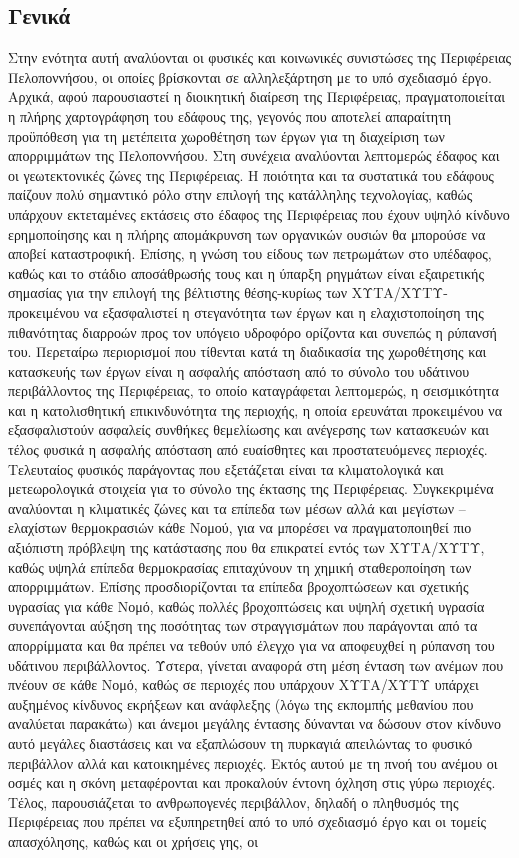 \documentclass[12pt]{article}
\begin{document}
	\subsection{Γενικά}
	
	Στην ενότητα αυτή αναλύονται οι φυσικές και κοινωνικές συνιστώσες της Περιφέρειας Πελοποννήσου, οι οποίες βρίσκονται σε αλληλεξάρτηση με το υπό σχεδιασμό έργο. Αρχικά, αφού παρουσιαστεί η διοικητική διαίρεση της Περιφέρειας, πραγματοποιείται η πλήρης χαρτογράφηση του εδάφους της, γεγονός που αποτελεί απαραίτητη προϋπόθεση για τη μετέπειτα χωροθέτηση των έργων για τη διαχείριση των απορριμμάτων της Πελοποννήσου. Στη συνέχεια αναλύονται λεπτομερώς έδαφος και οι γεωτεκτονικές ζώνες της Περιφέρειας. Η ποιότητα και τα συστατικά του εδάφους παίζουν πολύ σημαντικό ρόλο στην επιλογή της κατάλληλης τεχνολογίας, καθώς υπάρχουν εκτεταμένες εκτάσεις στο έδαφος της Περιφέρειας που έχουν υψηλό κίνδυνο ερημοποίησης και η πλήρης απομάκρυνση των οργανικών ουσιών θα μπορούσε να αποβεί καταστροφική. Επίσης, η γνώση του είδους των πετρωμάτων στο υπέδαφος, καθώς και το στάδιο αποσάθρωσής τους και η ύπαρξη ρηγμάτων είναι εξαιρετικής σημασίας για την επιλογή της βέλτιστης θέσης-κυρίως των ΧΥΤΑ/ΧΥΤΥ- προκειμένου να εξασφαλιστεί η στεγανότητα των έργων και η ελαχιστοποίηση της πιθανότητας διαρροών προς τον υπόγειο υδροφόρο ορίζοντα και συνεπώς η ρύπανσή του. Περεταίρω περιορισμοί που τίθενται κατά τη διαδικασία της χωροθέτησης και κατασκευής των έργων είναι η ασφαλής απόσταση από το σύνολο του υδάτινου περιβάλλοντος της Περιφέρειας, το οποίο καταγράφεται λεπτομερώς, η σεισμικότητα και η κατολισθητική επικινδυνότητα της περιοχής, η οποία ερευνάται προκειμένου να εξασφαλιστούν ασφαλείς συνθήκες θεμελίωσης και ανέγερσης των κατασκευών και τέλος φυσικά η ασφαλής απόσταση από ευαίσθητες και προστατευόμενες περιοχές. Τελευταίος φυσικός παράγοντας που εξετάζεται είναι τα κλιματολογικά και μετεωρολογικά στοιχεία για το σύνολο της έκτασης της Περιφέρειας. Συγκεκριμένα αναλύονται η κλιματικές ζώνες και τα επίπεδα των μέσων αλλά και μεγίστων –ελαχίστων θερμοκρασιών κάθε Νομού, για να μπορέσει να πραγματοποιηθεί πιο αξιόπιστη πρόβλεψη της κατάστασης που θα επικρατεί εντός των ΧΥΤΑ/ΧΥΤΥ, καθώς υψηλά επίπεδα θερμοκρασίας επιταχύνουν τη χημική σταθεροποίηση των απορριμμάτων. Επίσης προσδιορίζονται τα επίπεδα βροχοπτώσεων και σχετικής υγρασίας για κάθε Νομό, καθώς πολλές βροχοπτώσεις και υψηλή σχετική υγρασία συνεπάγονται αύξηση της ποσότητας των στραγγισμάτων που παράγονται από τα απορρίμματα και θα πρέπει να τεθούν υπό έλεγχο για να αποφευχθεί η ρύπανση του υδάτινου περιβάλλοντος. Ύστερα, γίνεται αναφορά στη μέση ένταση των ανέμων που πνέουν σε κάθε Νομό, καθώς σε περιοχές που υπάρχουν ΧΥΤΑ/ΧΥΤΥ υπάρχει αυξημένος κίνδυνος εκρήξεων και ανάφλεξης (λόγω της εκπομπής μεθανίου που αναλύεται παρακάτω) και άνεμοι μεγάλης έντασης δύνανται να δώσουν στον κίνδυνο αυτό μεγάλες διαστάσεις και να εξαπλώσουν τη πυρκαγιά απειλώντας το φυσικό περιβάλλον αλλά και κατοικημένες περιοχές. Εκτός αυτού με τη πνοή του ανέμου οι οσμές και η σκόνη μεταφέρονται και προκαλούν έντονη όχληση στις γύρω περιοχές. Τέλος, παρουσιάζεται το ανθρωπογενές περιβάλλον, δηλαδή ο πληθυσμός της Περιφέρειας που πρέπει να εξυπηρετηθεί από το υπό σχεδιασμό έργο και οι τομείς απασχόλησης, καθώς και οι χρήσεις γης, οι 
\end{document}
